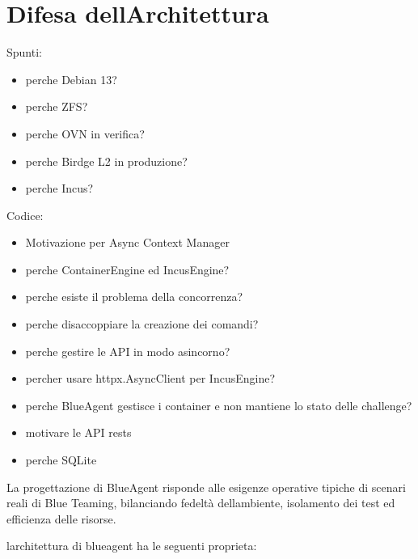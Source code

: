 \section{Difesa
dell\textquotesingle Architettura}\label{difesa-dellarchitettura}

Spunti:

\begin{itemize}
\tightlist
\item
  perche\textquotesingle{} Debian 13?
\item
  perche\textquotesingle{} ZFS?
\item
  perche\textquotesingle{} OVN in verifica?
\item
  perche\textquotesingle{} Birdge L2 in produzione?
\item
  perche\textquotesingle{} Incus?
\end{itemize}

Codice:

\begin{itemize}
\tightlist
\item
  Motivazione per Async Context Manager
\item
  perche ContainerEngine ed IncusEngine?
\item
  perche esiste il problema della concorrenza?
\item
  perche disaccoppiare la creazione dei comandi?
\item
  perche gestire le API in modo asincorno?
\item
  percher usare httpx.AsyncClient per IncusEngine?
\item
  perche BlueAgent gestisce i container e non mantiene lo stato delle
  challenge?
\item
  motivare le API rests
\item
  perche SQLite
\end{itemize}

La progettazione di BlueAgent risponde alle esigenze operative tipiche
di scenari reali di Blue Teaming, bilanciando fedeltà
dell\textquotesingle ambiente, isolamento dei test ed efficienza delle
risorse.

l\textquotesingle architettura di blueagent ha le seguenti proprieta:

